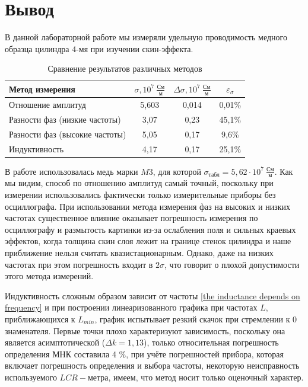 \documentclass[a4paper, 12pt]{article} %
\begin{document}
    \newpage
    
	\section {Вывод}
	В данной лабораторной работе мы измеряли удельную проводимость медного образца цилиндра 4-мя при изучении скин-эффекта.
	
	\begin{table}[h!]
		\begin{center}
			\begin{tabular}{|l|c|c|c|}
				\hline
				Метод измерения & $\sigma, 10^{7} \ \frac{\text{См}}{\text{м}}$ & $\Delta\sigma, 10^{7} \ \frac{\text{См}}{\text{м}}$ & $\varepsilon_{\sigma}$\\
				\hline
				Отношение амплитуд & 5,603 & 0,014 & 0,01\%\\ \hline
				Разности фаз (низкие частоты) & 3,07 & 0,23 & 45,1\%\\ \hline
				Разности фаз (высокие частоты) & 5,05 & 0,17 & 9,6\%\\ \hline
				Индуктивность & 4,17 & 0,17 & 25,1\%\\ \hline
				
			\end{tabular}
		\end{center}
		\caption{Сравнение результатов различных методов}\label{}
	\end{table}
	
	В работе использовалась медь марки $M3$, для которой $\sigma_{\text{табл}} = 5,62\cdot10^{7} \ \frac{\text{См}}{\text{м}}$. Как мы видим, способ по отношению амплитуд самый точный, поскольку при измерении использовались фактически только измерительные приборы без осциллографа. При использовании метода измерения фаз на высоких и низких частотах существенное влияние оказывает погрешность измерения по осциллографу и размытость картинки из-за ослабления поля и сильных краевых эффектов, когда толщина скин слоя лежит на границе стенок цилиндра и наше приближение нельзя считать квазистационарным. Однако, даже на низких частотах при этом погрешность входит в $2 \sigma$, что говорит о плохой допустимости этого метода измерений.

    Индуктивность сложным образом зависит от частоты \ref{the inductance depends on frequency} и при построении линеаризованного графика при частотах $L$, приближающихся к $L_{min}$, график испытывает резкий скачок при стремлении к 0 знаменателя. Первые точки плохо характеризуют зависимость, поскольку она является асимптотической ($\Delta k = 1,13$), только относительная погрешность определения МНК составила 4 \%, при учёте погрешностей прибора, которая включает погрешность определения и выбора частоты, некоторую неисправность используемого $LCR-\text{метра}$, имеем, что метод носит только оценочный характер.  
	
\end{document}

